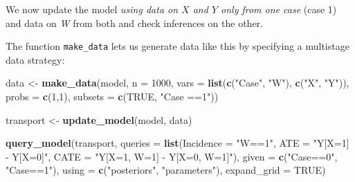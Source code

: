 \documentclass[
  12pt,
]{book}
\newenvironment{Shaded}{\begin{snugshade}}{\end{snugshade}}
\newcommand{\DataTypeTok}[1]{\textcolor[rgb]{0.13,0.29,0.53}{#1}}
\newcommand{\DecValTok}[1]{\textcolor[rgb]{0.00,0.00,0.81}{#1}}
\newcommand{\KeywordTok}[1]{\textcolor[rgb]{0.13,0.29,0.53}{\textbf{#1}}}
\newcommand{\NormalTok}[1]{#1}
\newcommand{\OtherTok}[1]{\textcolor[rgb]{0.56,0.35,0.01}{#1}}
\newcommand{\StringTok}[1]{\textcolor[rgb]{0.31,0.60,0.02}{#1}}
\begin{document}
We now update the model \emph{using data on \(X\) and \(Y\) only from one case} (case 1) and data on \emph{W} from both and check inferences on the other.

The function \texttt{make\_data} lets us generate data like this by specifying a multistage data strategy:

\begin{Shaded}
\begin{Highlighting}[]
\NormalTok{data <-}\StringTok{ }\KeywordTok{make_data}\NormalTok{(model, }\DataTypeTok{n =} \DecValTok{1000}\NormalTok{, }
                  \DataTypeTok{vars =} \KeywordTok{list}\NormalTok{(}\KeywordTok{c}\NormalTok{(}\StringTok{"Case"}\NormalTok{, }\StringTok{"W"}\NormalTok{), }\KeywordTok{c}\NormalTok{(}\StringTok{"X"}\NormalTok{, }\StringTok{"Y"}\NormalTok{)), }
                  \DataTypeTok{probs =} \KeywordTok{c}\NormalTok{(}\DecValTok{1}\NormalTok{,}\DecValTok{1}\NormalTok{),}
                  \DataTypeTok{subsets =} \KeywordTok{c}\NormalTok{(}\OtherTok{TRUE}\NormalTok{, }\StringTok{"Case ==1"}\NormalTok{))}

\NormalTok{transport <-}\StringTok{ }\KeywordTok{update_model}\NormalTok{(model, data)}

\KeywordTok{query_model}\NormalTok{(transport,}
            \DataTypeTok{queries =} \KeywordTok{list}\NormalTok{(}\DataTypeTok{Incidence =} \StringTok{"W==1"}\NormalTok{, }
                           \DataTypeTok{ATE =} \StringTok{"Y[X=1] - Y[X=0]"}\NormalTok{, }
                           \DataTypeTok{CATE =} \StringTok{"Y[X=1, W=1] - Y[X=0, W=1]"}\NormalTok{),}
            \DataTypeTok{given =} \KeywordTok{c}\NormalTok{(}\StringTok{"Case==0"}\NormalTok{, }\StringTok{"Case==1"}\NormalTok{),}
            \DataTypeTok{using =} \KeywordTok{c}\NormalTok{(}\StringTok{"posteriors"}\NormalTok{, }\StringTok{"parameters"}\NormalTok{), }\DataTypeTok{expand_grid =} \OtherTok{TRUE}\NormalTok{)}
\end{Highlighting}
\end{Shaded}
\end{document}

